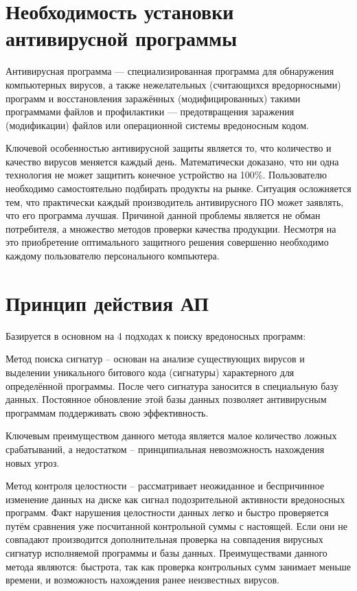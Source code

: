 \documentclass[%
preprint,
amsmath,amssymb,
aps,
]{revtex4-2}
\begin{document}
\section{Необходимость установки антивирусной программы}
$\textbf{Антивирусная программа}$ — специализированная программа для обнаружения компьютерных вирусов, а также нежелательных (считающихся вредорносными) программ и восстановления заражённых (модифицированных) такими программами файлов и профилактики — предотвращения заражения (модификации) файлов или операционной системы вредоносным кодом.

 Ключевой особенностью антивирусной защиты является то, что количество и качество вирусов меняется каждый день. Математически доказано, что ни одна технология не может защитить конечное устройство на 100\%. Пользователю необходимо самостоятельно подбирать продукты на рынке. Ситуация осложняется тем, что практически каждый производитель антивирусного ПО может заявлять, что его программа лучшая. Причиной данной проблемы является не обман потребителя, а множество методов проверки качества продукции. Несмотря на это приобретение оптимального защитного решения совершенно необходимо каждому пользователю персонального компьютера. \\


\section{Принцип действия АП}
Базируется в основном на 4 подходах к поиску вредоносных программ:

$\textbf{Метод поиска сигнатур}$ – основан на анализе существующих вирусов и выделении уникального битового кода (сигнатуры) характерного для определённой программы. После чего сигнатура заносится в специальную базу данных. Постоянное обновление этой базы данных позволяет антивирусным программам поддерживать свою эффективность. 

Ключевым преимуществом данного метода является малое количество ложных срабатываний, а недостатком – принципиальная невозможность нахождения новых угроз.

	$\textbf{Метод контроля целостности}$ – рассматривает неожиданное и беспричинное изменение данных на диске как сигнал подозрительной активности вредоносных программ. Факт нарушения целостности данных легко и быстро проверяется путём сравнения уже посчитанной контрольной суммы с настоящей. Если они не совпадают производится дополнительная проверка на совпадения вирусных сигнатур исполняемой программы и базы данных. Преимуществами данного метода являются: быстрота, так как проверка контрольных сумм занимает меньше времени, и возможность нахождения ранее неизвестных вирусов. 
\end{document}

